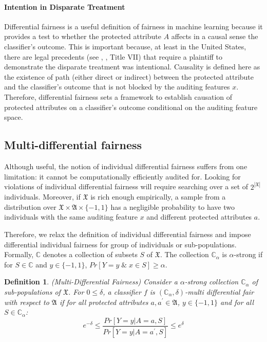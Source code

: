 \documentclass{article}
\newtheorem{defn}{Definition}[section]
\begin{document}
\paragraph{Intention in Disparate Treatment}
Differential fairness is a useful definition of fairness in machine learning because it provides a test to whether the protected attribute $A$ affects in a causal sense the classifier's outcome. This is important because, at least in the United States, there are legal precedents (see \cite{Ricci}, \cite{Loomis}, Title VII) that require a plaintiff to demonstrate the disparate treatment was intentional. Causality is defined here as the existence of path (either direct or indirect) between the protected attribute and the classifier's outcome that is not blocked by the auditing features $x$. Therefore, differential fairness sets a framework to establish causation of protected attributes on a classifier's outcome conditional on the auditing feature space. 

\subsection{Multi-differential fairness}
Although useful, the notion of individual differential fairness suffers from one limitation: it cannot be computationally efficiently audited for. Looking for violations of individual differential fairness will require searching over a set of $2^{|\mathfrak{X}|}$ individuals. Moreover, if $\mathfrak{X}$ is rich enough empirically, a sample from a distribution over $\mathfrak{X} \times \mathfrak{A}\times \{-1, 1\}$ has a negligible probability to have two individuals with the same auditing feature $x$ and different protected attributes $a$. 

\bigskip
Therefore, we relax the definition of individual differential fairness and impose differential individual fairness for group of individuals or sub-populations. Formally, $\mathbb{C}$ denotes a collection of subsets $S$ of $\mathfrak{X}$. The collection $\mathbb{C}_{\alpha}$ is $\alpha$-strong if for $S\in \mathbb{C}$ and $y\in \{-1, 1\}$, $Pr[Y=y \;\&\; x\in S] \geq \alpha$.  

\begin{defn}(Multi-Differential Fairness)
\label{def: mdf}
Consider a $\alpha$-strong collection $\mathbb{C}_{\alpha}$ of sub-populations of $\mathfrak{X}$. For $0\leq \delta$, a classifier $f$ is $(\mathbb{C}_{\alpha}, \delta)$-multi differential fair with respect to $\mathfrak{A}$ if for all protected attributes $a, a^{'}\in \mathfrak{A}$, $y\in\{-1, 1\}$ and for all $S\in \mathbb{C}_{\alpha}$:
\begin{equation}
\label{eq: mdf}
e^{-\delta} \leq \frac{Pr[Y=y|A=a, S]}{Pr[Y=y|A=a^{'}, S]} \leq e^{\delta} 
\end{equation}
\end{defn}
\end{document}
